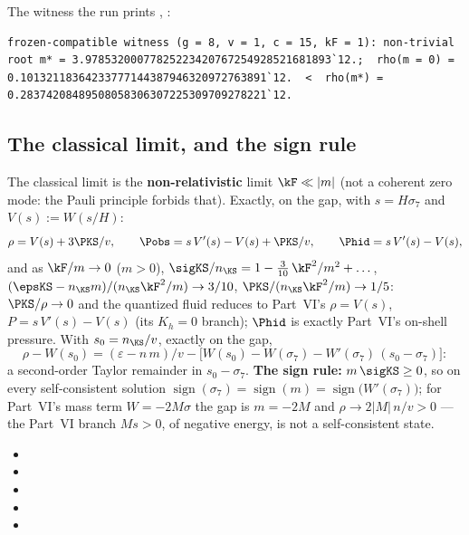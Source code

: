 The witness the run prints , :
\begin{Verbatim}[fontsize=\scriptsize]
  frozen-compatible witness (g = 8, v = 1, c = 15, kF = 1): non-trivial root m* = 3.97853200077825223420767254928521681893`12.;  rho(m = 0) = 0.10132118364233777144387946320972763891`12.  <  rho(m*) = 0.28374208489508058306307225309709278221`12.
\end{Verbatim}

\subsection{The classical limit, and the sign rule}
\label{sec:7.8}

The classical limit is the \textbf{non-relativistic} limit $\kF\ll|m|$ (not a coherent zero mode: the
Pauli principle forbids that). Exactly, on the gap, with $s=H\sigma_7$ and $V(s):=W(s/H)$:
\[
  \rho=V(s)+3\PKS/v,\qquad \Pobs=s\,V'(s)-V(s)+\PKS/v,\qquad \Phid=s\,V'(s)-V(s),
\]
and as $\kF/m\to0$ ($m>0$), $\sigKS/n_{\KS}=1-\tfrac{3}{10}\,\kF^2/m^2+\dots$,
$(\epsKS-n_{\KS}m)/(n_{\KS}\kF^2/m)\to3/10$, $\PKS/(n_{\KS}\kF^2/m)\to1/5$: $\PKS/\rho\to0$ and the quantized
fluid reduces to Part~VI's $\rho=V(s)$, $P=s\,V'(s)-V(s)$ (its $K_h=0$ branch); $\Phid$ is exactly Part~VI's
on-shell pressure. With $s_0=n_{\KS}/v$, exactly on the gap,
\[
  \rho-W(s_0)=(\varepsilon-n\,m)/v-\bigl[W(s_0)-W(\sigma_7)-W'(\sigma_7)\,(s_0-\sigma_7)\bigr]:
\]
a second-order Taylor remainder in $s_0-\sigma_7$. \textbf{The sign rule:} $m\,\sigKS\geq0$, so on every
self-consistent solution $\operatorname{sign}(\sigma_7)=\operatorname{sign}(m)=\operatorname{sign}\bigl(W'(\sigma_7)\bigr)$;
for Part~VI's mass term $W=-2M\sigma$ the gap is $m=-2M$ and $\rho\to2|M|\,n/v>0$ --- the Part~VI branch
$Ms>0$, of negative energy, is not a self-consistent state. 
\begin{itemize}
  \item {}
  \item {}
  \item {}
  \item {}
  \item {}
\end{itemize}
